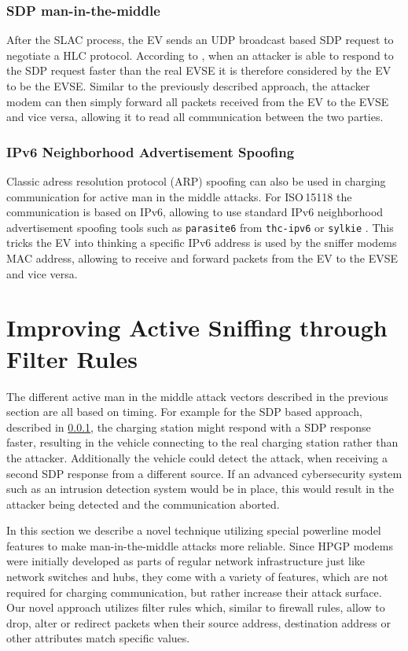 \documentclass[sigconf]{acmart}
\begin{document}
\subsubsection{SDP man-in-the-middle}
\label{sec:sdp-mitm}
After the SLAC process, the EV sends an UDP broadcast based SDP request to negotiate a HLC protocol. According to \citep[p.\,9]{bao_threat_2018}, when an attacker is able to respond to the SDP request faster than the real EVSE  it is therefore considered by the EV to be the EVSE. Similar to the previously described approach, the attacker modem can then simply forward all packets received from the EV to the EVSE and vice versa, allowing it to read all communication between the two parties.

\subsubsection{IPv6 Neighborhood Advertisement Spoofing}
Classic adress resolution protocol (ARP) spoofing can also be used in charging communication for active man in the middle attacks.
For ISO\,15118 the communication is based on IPv6, allowing to use standard IPv6 neighborhood advertisement spoofing tools such as \texttt{parasite6} from \texttt{thc-ipv6} \cite{thcIpv6} or \texttt{sylkie} \cite{sylkie}.
This tricks the EV into thinking a specific IPv6 address is used by the sniffer modems MAC address, allowing to receive and forward packets from the EV to the EVSE and vice versa.

\section{Improving Active Sniffing through Filter Rules}
\label{sec:filter-rules}

The different active man in the middle attack vectors described in the previous section are all based on timing.
For example for the SDP based approach, described in \ref{sec:sdp-mitm}, the charging station might respond with a SDP response faster, resulting in the vehicle connecting to the real charging station rather than the attacker.
Additionally the vehicle could detect the attack, when receiving a second SDP response from a different source.
If an advanced cybersecurity system such as an intrusion detection system would be in place, this would result in the attacker being detected and the communication aborted.

In this section we describe a novel technique utilizing special powerline model features to make man-in-the-middle attacks more reliable.
Since HPGP modems were initially developed as parts of regular network infrastructure just like network switches and hubs, they come with a variety of features, which are not required for charging communication, but rather increase their attack surface.
Our novel approach utilizes filter rules which, similar to firewall rules, allow to drop, alter or redirect packets when their source address, destination address or other attributes match specific values.
\end{document}
